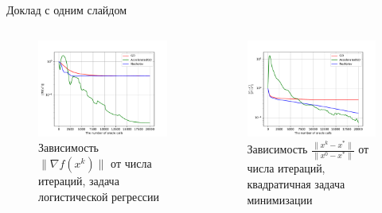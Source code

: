 \documentclass{beamer}
\begin{document}
\begin{frame}{Доклад с одним слайдом}

\begin{columns}[c]
\begin{figure}
\includegraphics[width=1.0\textwidth]{Non_stochastic_Logreg_GD_AGD_Nesterov_15_1e-07_1e-05.pdf}
    \caption{Зависимость $\|\nabla f(x^k)\|$ от числа итераций, задача логистической регрессии}
\end{figure}
\begin{figure}
\includegraphics[width=1.0\textwidth]{Deterministic_quadratic_GD_AGD_Nesterov_15.pdf}
    \caption{Зависимость $\frac{\|x^k - x^*\|}{\|x^0 - x^*\|}$ от числа итераций, квадратичная задача минимизации}
    \end{figure}
\end{columns}

\end{frame}
\end{document}
